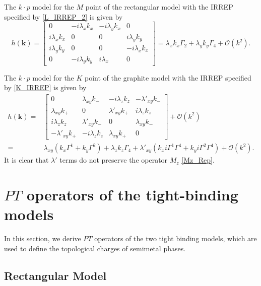 \documentclass[aps,prl,twocolumn,noshowpacs,superscriptaddress]{revtex4-1}
\begin{document}
The $k\cdot p$ model for the $M$ point of the rectangular model with the IRREP specified by \eqref{L_IRREP_2} is given by
\begin{equation}
	h(\bm{k})=\begin{bmatrix}
		0 & -i\lambda_x k_x & -i\lambda_y k_x & 0\\
		i\lambda_x k_x & 0 & 0 & i\lambda_y k_y\\
		i\lambda_y k_y & 0 & 0 & -i\lambda_x k_x\\
		0 & -i\lambda_y k_y & i\lambda_x & 0
	\end{bmatrix}=\lambda_x k_x \Gamma_2+\lambda_y k_y\Gamma_4 +\mathcal{O}(k^2).
\end{equation}

The $k\cdot p$ model for the $K$ point of the graphite model with the IRREP specified by \eqref{K_IRREP} is given by
\begin{equation}\label{Graphite-kp}
	\begin{split}
		h(\bm{k})=&\begin{bmatrix}
			0 & \lambda_{xy}k_- & -i\lambda_z k_z & -\lambda'_{xy}k_-\\
			\lambda_{xy}k_+ & 0 & \lambda'_{xy}k_+ & i\lambda_z k_z\\
			i\lambda_z k_z & \lambda'_{xy}k_- & 0 & \lambda_{xy}k_-\\
			-\lambda'_{xy}k_+ & -i\lambda_z k_z & \lambda_{xy}k_+ & 0
		\end{bmatrix}+\mathcal{O}(k^2)\\=&\lambda_{xy}(k_x\Gamma^1 + k_y\Gamma^2)+\lambda_z k_z\Gamma_4+\lambda'_{xy}(k_xi\Gamma^1\Gamma^4 + k_yi\Gamma^2\Gamma^4)+\mathcal{O}(k^2).
	\end{split}
\end{equation} 
It is clear that $\lambda'$ terms do not preserve the operator $M_z$ \eqref{Mz_Rep}.



\section{$ PT $ operators of the tight-binding models}

In this section, we derive $PT$ operators of the two tight binding models, which are used to define the topological charges of semimetal phases.

\subsection{Rectangular Model}
\end{document}
